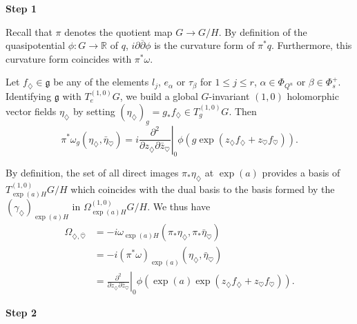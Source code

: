 \documentclass{amsart}
\theoremstyle{definition}
\begin{document}
\mbox{}

\textbf{Step 1}

Recall that $\pi$ denotes the quotient map $G\rightarrow G/H$. 
By definition of the quasipotential $\phi : G \rightarrow \mathbb{R}$ of $q$, 
$i\partial \overline{\partial} \phi$ is the curvature form of $\pi^*q$. 
Furthermore, this curvature form coincides with $\pi^*\omega$.

Let $f_{\diamondsuit}\in \mathfrak{g}$ be any of the elements $l_j$, $e_{\alpha}$ or $\tau_{\beta}$ 
for $1\leq j\leq r$, $\alpha\in \Phi_{Q^u}$ or $\beta\in \Phi_s^+$. 
Identifying $\mathfrak{g}$ with $T^{(1,0)}_eG$, we build a global $G$-invariant 
$(1,0)$ holomorphic vector fields $\eta_{\diamondsuit}$ by setting 
$(\eta_{\diamondsuit})_g=g_*f_{\diamondsuit}\in T^{(1,0)}_gG$. 
Then 
\[
\pi^*\omega_g(\eta_{\diamondsuit},\bar{\eta}_{\heartsuit}) = 
\left.i \frac{\partial^2}{\partial z_{\diamondsuit} \partial \bar{z}_{\heartsuit}}\right|_0
\phi(g\exp(z_{\diamondsuit}f_{\diamondsuit} + z_{\heartsuit}f_{\heartsuit})).
\]

By definition, the set of all direct images $\pi_*\eta_{\diamondsuit}$ at $\exp(a)$ 
provides a basis of $T^{(1,0)}_{\exp(a)H}G/H$ which coincides with the dual basis to
the basis formed by the $(\gamma_{\diamondsuit})_{\exp(a)H}$ in 
$\Omega^{(1,0)}_{\exp(a)H}G/H$.
We thus have 
\begin{align*}
\Omega_{\diamondsuit,\bar{\heartsuit}} & = -i \omega_{\exp(a)H}(\pi_*\eta_{\diamondsuit},\pi_*\bar{\eta}_{\heartsuit}) \\
& = - i (\pi^*\omega)_{\exp(a)}(\eta_{\diamondsuit},\bar{\eta}_{\heartsuit}) \\
& = \left. \frac{\partial^2}{\partial z_{\diamondsuit} \partial \bar{z}_{\heartsuit}}\right|_0
\phi(\exp(a)\exp(z_{\diamondsuit}f_{\diamondsuit} + z_{\heartsuit}f_{\heartsuit})).
\end{align*}

\textbf{Step 2}
\end{document}
